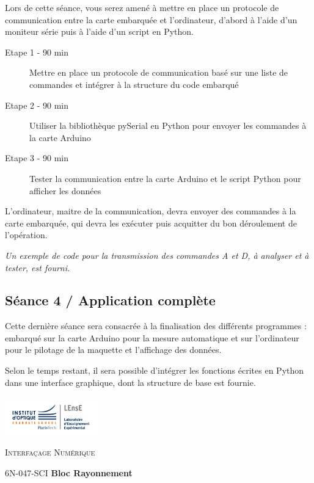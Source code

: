 \documentclass[a4paper,11pt,titlepage]{article} %
\begin{document}
Lors de cette séance, vous serez amené à mettre en place un protocole de communication entre la carte embarquée et l'ordinateur, d'abord à l'aide d'un moniteur série puis à l'aide d'un script en Python.

	\begin{description}
		\item[Etape 1 - 90 min] Mettre en place un protocole de communication basé sur une liste de commandes et intégrer à la structure du code embarqué
		\item[Etape 2 - 90 min] Utiliser la bibliothèque pySerial en Python pour envoyer les commandes à la carte Arduino
		\item[Etape 3 - 90 min] Tester la communication entre la carte Arduino et le script Python pour afficher les données
	\end{description}

\medskip

L'ordinateur, maitre de la communication, devra envoyer des commandes à la carte embarquée, qui devra les exécuter puis acquitter du bon déroulement de l'opération.\

\textit{Un exemple de code pour la transmission des commandes A et D, à analyser et à tester, est fourni.}


\subsection{Séance 4 / Application complète}

Cette dernière séance sera consacrée à la finalisation des différents programmes : embarqué sur la carte Arduino pour la mesure automatique et sur l'ordinateur pour le pilotage de la maquette et l'affichage des données.

Selon le temps restant, il sera possible d'intégrer les fonctions écrites en Python dans une interface graphique, dont la structure de base est fournie.


\newpage
\strut %

\begin{minipage}[c]{.25\linewidth}
	\includegraphics[width=4cm]{images/Logo-LEnsE.png}
\end{minipage} \hfill
\begin{minipage}[c]{.4\linewidth}

\begin{center}
\vspace{0.3cm}
{\Large \textsc{Interfaçage Numérique}}

\medskip

6N-047-SCI \qquad \textbf{\Large Bloc Rayonnement}

\end{center}
\end{minipage}\hfill
\end{document}
